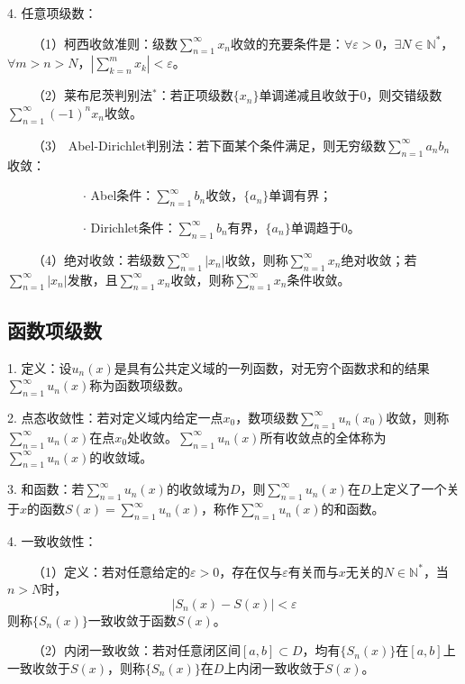4. 任意项级数：

~~~~（1）柯西收敛准则：级数$\sum\limits_{n=1}^\infty x_n$收敛的充要条件是：$\forall \varepsilon>0$，$\exists N \in \mathbb{N}^*$，$\forall m>n>N$，$\left|\sum\limits_{k=n}^m x_k\right|<\varepsilon$。

~~~~（2）莱布尼茨判别法$^*$：若正项级数$\{x_n\}$单调递减且收敛于$0$，则交错级数$\sum\limits_{n=1}^\infty (-1)^n x_n$收敛。

~~~~（3） Abel-Dirichlet判别法：若下面某个条件满足，则无穷级数$\sum\limits_{n=1}^\infty a_nb_n$收敛：

~~~~~~~~~~~~$\cdot$ Abel条件：$\sum\limits_{n=1}^\infty b_n$收敛，$\{a_n\}$单调有界；

~~~~~~~~~~~~$\cdot$ Dirichlet条件：$\sum\limits_{n=1}^\infty b_n$有界，$\{a_n\}$单调趋于$0$。

~~~~（4）绝对收敛：若级数$\sum\limits_{n=1}^\infty \left|x_n\right|$收敛，则称$\sum\limits_{n=1}^\infty x_n$绝对收敛；若$\sum\limits_{n=1}^\infty \left|x_n\right|$发散，且$\sum\limits_{n=1}^\infty x_n$收敛，则称$\sum\limits_{n=1}^\infty x_n$条件收敛。

\subsection{函数项级数}

1. 定义：设$u_n(x)$是具有公共定义域的一列函数，对无穷个函数求和的结果$\sum\limits_{n=1}^{\infty} u_n(x)$称为函数项级数。

2. 点态收敛性：若对定义域内给定一点$x_0$，数项级数$\sum\limits_{n=1}^{\infty} u_n(x_0)$收敛，则称$\sum\limits_{n=1}^{\infty} u_n(x)$在点$x_0$处收敛。$\sum\limits_{n=1}^{\infty} u_n(x)$所有收敛点的全体称为$\sum\limits_{n=1}^{\infty} u_n(x)$的收敛域。

3. 和函数：若$\sum\limits_{n=1}^{\infty} u_n(x)$的收敛域为$D$，则$\sum\limits_{n=1}^{\infty} u_n(x)$在$D$上定义了一个关于$x$的函数$S(x)=\sum\limits_{n=1}^{\infty} u_n(x)$，称作$\sum\limits_{n=1}^{\infty} u_n(x)$的和函数。

4. 一致收敛性：

~~~~（1）定义：若对任意给定的$\varepsilon>0$，存在仅与$\varepsilon$有关而与$x$无关的$N\in \mathbb{N}^*$，当$n>N$时，
\begin{equation*}
    \left|S_n(x)-S(x)\right|<\varepsilon
\end{equation*}
则称$\{S_n(x)\}$一致收敛于函数$S(x)$。

~~~~（2）内闭一致收敛：若对任意闭区间$[a,b]\subset D$，均有$\{S_n(x)\}$在$[a,b]$上一致收敛于$S(x)$，则称$\{S_n(x)\}$在$D$上内闭一致收敛于$S(x)$。


